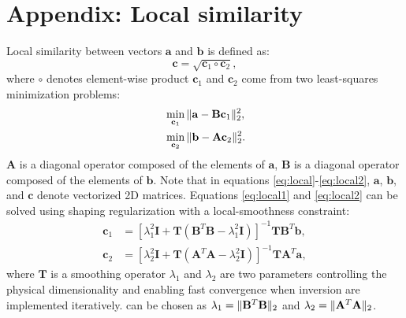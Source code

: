 \section{Appendix: Local similarity}
 Local similarity between vectors $\mathbf{a}$ and $\mathbf{b}$ is defined as:
\begin{equation}
\label{eq:local}
\mathbf{c}=\sqrt{\mathbf{c}_1\circ\mathbf{c}_2},
\end{equation}
where $\circ$ denotes element-wise product\dlo{,} $\mathbf{c}_1$ and $\mathbf{c}_2$ come from two least-squares minimization problems:
\begin{align}
\label{eq:local1}
&\min_{\mathbf{c}_1}\Arrowvert \mathbf{a}-\mathbf{B} \mathbf{c}_1 \Arrowvert_2^2, \\
\label{eq:local2}
&\min_{\mathbf{c}_2}\Arrowvert \mathbf{b}-\mathbf{A} \mathbf{c}_2 \Arrowvert_2^2.
\end{align}
 $\mathbf{A}$ is a diagonal operator composed of the elements of $\mathbf{a}$, $\mathbf{B}$ is a diagonal operator composed of the elements of $\mathbf{b}$. Note that in equations \ref{eq:local}-\ref{eq:local2}, $\mathbf{a}$, $\mathbf{b}$, and $\mathbf{c}$  denote vectorized 2D matrices. Equations \ref{eq:local1} and \ref{eq:local2} can be solved using shaping regularization with a local-smoothness constraint:
\begin{align}
\label{eq:local3}
\mathbf{c}_1 &= [\lambda_1^2\mathbf{I} + \mathbf{T}(\mathbf{B}^T\mathbf{B}-\lambda_1^2\mathbf{I})]^{-1}\mathbf{TB}^T\mathbf{b},\\
\label{eq:local4}
\mathbf{c}_2 &= [\lambda_2^2\mathbf{I} + \mathbf{T}(\mathbf{A}^T\mathbf{A}-\lambda_2^2\mathbf{I})]^{-1}\mathbf{TA}^T\mathbf{a},
\end{align}
where $\mathbf{T}$ is a smoothing operator\wen{,} $\lambda_1$ and $\lambda_2$ are two parameters controlling the physical dimensionality and enabling fast convergence when inversion  are implemented iteratively.  can be chosen as $\lambda_1  = \Arrowvert\mathbf{B}^T\mathbf{B}\Arrowvert_2$ and $\lambda_2  = \Arrowvert\mathbf{A}^T\mathbf{A}\Arrowvert_2$.



